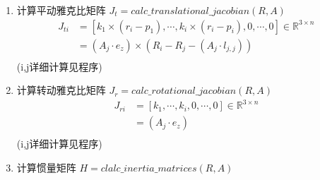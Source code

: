 \documentclass[UTF8]{ctexart}
\begin{document}
\begin{enumerate}[itemindent=0.3em]
	\item 计算平动雅克比矩阵 $ J_t = calc\_translational\_jacobian(R,A)$ 
	\begin{align*}
		J_{ti} &= \left[k_1 \times(r_i-p_1),\cdots,k_i \times(r_i-p_i),0,\cdots,0\right]\in \mathbb{R}^{3\times n}\\
		& = (A_j\cdot e_z) \times (R_i - R_j - (A_j \cdot l_{j,j}))\\
	\end{align*}
	(i,j详细计算见程序)
	\item 计算转动雅克比矩阵 $ J_r = calc\_rotational\_jacobian(R,A)$ 
	\begin{align*}
	J_{r i} &= \left[k_1 ,\cdots,k_i ,0,\cdots,0\right]\in \mathbb{R}^{3\times n}\\
	& = (A_j\cdot e_z) \\
	\end{align*}
	(i,j详细计算见程序)
	\item 计算惯量矩阵 $ H = clalc\_inertia\_matrices(R,A)$
	\begin{comment}
		\begin{eqnarray*}
		J_t &= &calc\_translational\_jacobian(R,A) \\
		J_r &= &calc\_rotational\_jacobian(R,A)\\
		\omega E&=& M E_{3\times3}\\
		\omega r_{0g}&=& (R_g -R_0)M\\
		J_{tg} &=& \sum m_i J_{ti}\\
		H_\omega &=& \sum A_i\cdot inertia_i\cdot A_i^T+m_i\tilde{r}_{0i}^T\cdot\tilde{r}_{0i}	 \\
		H_{\omega q} &=& \sum (A_i\cdot inertia_i \cdot A_i^T)\cdot J_{ri} + m_i\tilde{r}_{0i}\cdot J_{ti}\\
		H_q &=& J_{ri}^T\cdot A_i\cdot inertia_i \cdot A_i^T\cdot J_{ri} +m_i J_{ti}^T J_{ti}
		\end{eqnarray*}
	\end{comment}
	

\end{enumerate}
\end{document}
